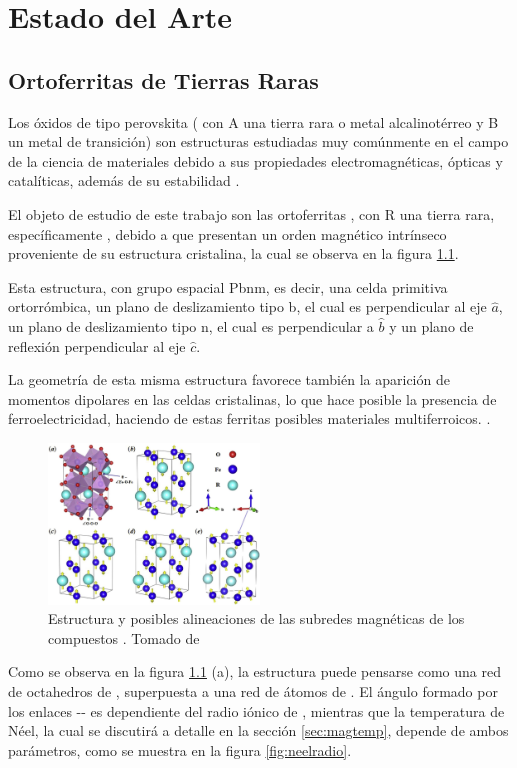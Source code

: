 \documentclass[../main.tex]{subfiles}
\begin{document}
\chapter{Estado del Arte}
\section{Ortoferritas de Tierras Raras}
Los óxidos de tipo perovskita ( con A una tierra rara o metal alcalinotérreo y B un metal de transición) son estructuras estudiadas muy comúnmente en el campo de la ciencia de materiales debido a sus propiedades electromagnéticas, ópticas y catalíticas, además de su estabilidad \cite{Wang2019}.

El objeto de estudio de este trabajo son las ortoferritas , con R una tierra rara, específicamente , debido a que presentan un orden magnético intrínseco proveniente de su estructura cristalina, la cual se observa en la figura \ref{fig:estructuras}. 

Esta estructura, con grupo espacial Pbnm, es decir, una celda primitiva ortorrómbica, un plano de deslizamiento tipo b, el cual es perpendicular al eje $\hat{a}$, un plano de deslizamiento tipo n, el cual es perpendicular a $\hat{b}$ y un plano de reflexión perpendicular al eje $\hat{c}$.

La geometría de esta misma estructura favorece también la aparición de momentos dipolares en las celdas cristalinas, lo que hace posible la presencia de ferroelectricidad, haciendo de estas ferritas posibles materiales multiferroicos. \cite{Sharma2024}.
\begin{figure}[H]
    \centering
    \includegraphics[width=0.5\textwidth]{fig/estructura.jpg}
    \caption{Estructura y posibles alineaciones de las subredes magnéticas de los compuestos . Tomado de \cite{Wang2019}}
    \label{fig:estructuras}
\end{figure}

Como se observa en la figura \ref{fig:estructuras} (a), la estructura puede pensarse como una red de octahedros de , superpuesta a una red de átomos de . El ángulo formado por los enlaces -- es dependiente del radio iónico de , mientras que la temperatura de Néel, la cual se discutirá a detalle en la sección \ref{sec:magtemp}, depende de ambos parámetros, como se muestra en la figura \ref{fig:neelradio}.
\end{document}
